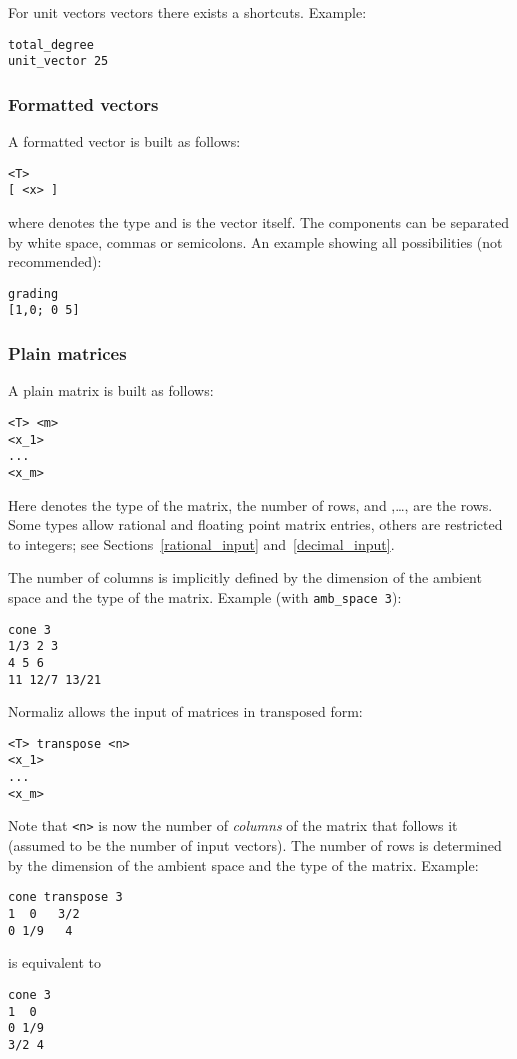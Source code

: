 For unit vectors vectors there exists a  shortcuts. Example:
\begin{Verbatim}
total_degree
unit_vector 25
\end{Verbatim}


\subsubsection{Formatted vectors}

A formatted vector is built as follows:
\begin{Verbatim}
<T>
[ <x> ]
\end{Verbatim}
where  denotes the type and  is the vector itself. The components can be separated by white space, commas or semicolons. An example showing all possibilities (not recommended):
\begin{Verbatim}
grading
[1,0; 0 5]
\end{Verbatim}

\subsubsection{Plain matrices}

A plain matrix is built as follows:
\begin{Verbatim}
<T> <m>
<x_1>
...
<x_m>
\end{Verbatim}
Here  denotes the type of the matrix,  the number of rows, and ,\dots, are the rows. Some types allow rational and floating point matrix entries, others are restricted to integers; see Sections~\ref{rational_input} and~\ref{decimal_input}.

The number of columns is implicitly defined by the dimension of the ambient space and the type of the matrix. Example (with \verb|amb_space 3|):
\begin{Verbatim}
cone 3
1/3 2 3
4 5 6
11 12/7 13/21
\end{Verbatim}

Normaliz allows the input of matrices in transposed form:
\begin{Verbatim}
<T> transpose <n>
<x_1>
...
<x_m>
\end{Verbatim}
Note that \verb|<n>| is now the number of \emph{columns} of the matrix that follows it (assumed to be the number of input vectors). The number of rows is determined by the dimension of the ambient space and the type of the matrix. Example:
\begin{Verbatim}
cone transpose 3
1  0   3/2
0 1/9   4
\end{Verbatim}
is equivalent to
\begin{Verbatim}
cone 3
1  0
0 1/9
3/2 4
\end{Verbatim}

